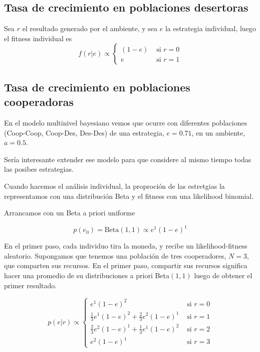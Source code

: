 \documentclass[a4paper,10pt]{article}
\begin{document}
\subsection{Tasa de crecimiento en poblaciones desertoras}

Sea $r$ el resultado generado por el ambiente, y sea $e$ la estrategia individual, luego el fitness individual es
\begin{equation}
f(r|e) \propto 
\begin{cases}
(1-e) & \text{ si } r = 0 \\
e & \text{ si } r = 1
\end{cases}
\end{equation}



\subsection{Tasa de crecimiento en poblaciones cooperadoras}

En el modelo multinivel bayesiano vemos que ocurre con diferentes  poblaciones (Coop-Coop, Coop-Des, Des-Des) de una estrategia, $e = 0.71$, en un ambiente, $a = 0.5$.

Sería interesante extender ese modelo para que considere al mismo tiempo todas las posibes estrategias.

Cuando hacemos el análisis individual, la proproción de las estretgias la representamos con una distribución Beta y el fitness con una likelihood binomial.

Arrancamos con un Beta a priori uniforme

\begin{equation}
p(e_0) = \text{Beta}(1,1) \propto e^1 (1-e)^1 
\end{equation}

En el primer paso, cada individuo tira la moneda, y recibe un likelihood-fitness aleatorio.
Supongamos que tenemos una población de tres cooperadores, $N=3$, que comparten sus recursos.
En el primer paso, compartir sus recursos significa hacer una promedio de su distribuciones a priori Beta$(1,1)$ luego de obtener el primer resultado.

\begin{equation}
p(e|r) \propto 
\begin{cases}
e^1 (1-e)^2 & \text{ si } r = 0 \\
\frac{1}{3} e^1 (1-e)^2 + \frac{2}{3} e^2 (1-e)^1  & \text{ si } r = 1 \\
\frac{2}{3} e^2 (1-e)^1 + \frac{1}{3} e^1 (1-e)^2    & \text{ si } r = 2 \\
e^2 (1-e)^1 & \text{ si } r = 3
\end{cases}
\end{equation}
\end{document}
